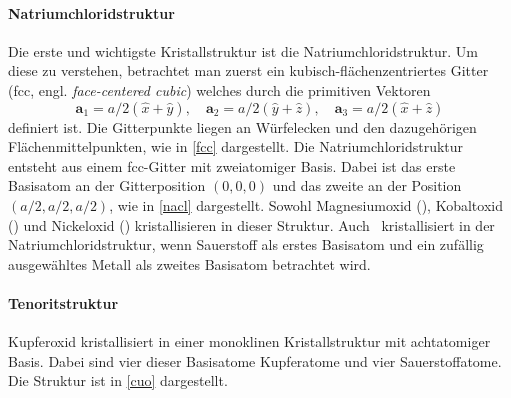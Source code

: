 \paragraph{Natriumchloridstruktur}
Die erste und wichtigste Kristallstruktur ist die Natriumchloridstruktur.
Um diese zu verstehen, betrachtet man zuerst ein kubisch-flächen\-zen\-trier\-tes Gitter (fcc, engl.
\textit{face-centered cubic}) welches durch die primitiven Vektoren
\begin{equation}
    \mathbf{a}_1 = a / 2 (\hat{x} + \hat{y}), \quad
    \mathbf{a}_2 = a / 2 (\hat{y} + \hat{z}), \quad
    \mathbf{a}_3 = a / 2 (\hat{x} + \hat{z})
    \label{eq:fcc}
\end{equation}
definiert ist.
Die Gitterpunkte liegen an Würfelecken und den dazugehörigen Flächenmittelpunkten, wie in \cref{fcc} dargestellt.
\autocite[37-38]{Grundmann}
Die Natriumchloridstruktur entsteht aus einem fcc-Gitter mit zweiatomiger Basis.
Dabei ist das erste Basisatom an der Gitterposition $(0,0,0)$ und das zweite an der Position $(a/2,a/2,a/2)$, wie in
\cref{nacl} dargestellt.\autocite[45]{Grundmann}
Sowohl Magnesiumoxid (), Kobaltoxid () und Nickeloxid () kristallisieren in dieser Struktur.
Auch \heo\ kristallisiert in der Natriumchloridstruktur, wenn
Sauerstoff als erstes Basisatom und ein zufällig ausgewähltes Metall als zweites Basisatom betrachtet wird.
\autocite[5]{Rost2015}

\paragraph{Tenoritstruktur}
Kupferoxid kristallisiert in einer monoklinen Kristall\-struk\-tur mit achtatomiger Basis.
Dabei sind vier dieser Basisatome Kupferatome und vier Sauerstoffatome.
Die Struktur ist in \cref{cuo} dargestellt.\autocite[7]{kupferoxid}


